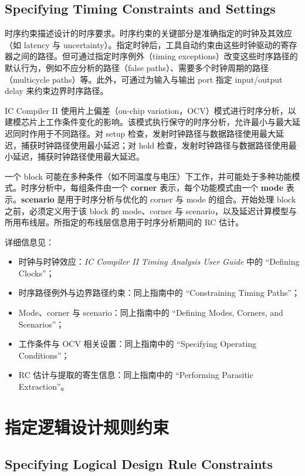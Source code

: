 \subsection*{Specifying Timing Constraints and Settings}

时序约束描述设计的时序要求。时序约束的关键部分是准确指定的时钟及其效应（如 latency 与 uncertainty）。指定时钟后，工具自动约束由这些时钟驱动的寄存器之间的路径。但可通过指定时序例外（timing exceptions）改变这些时序路径的默认行为，例如不应分析的路径（false paths）、需要多个时钟周期的路径（multicycle paths）等。此外，可通过为输入与输出 port 指定 input/output delay 来约束边界时序路径。

IC Compiler II 使用片上偏差（on-chip variation，OCV）模式进行时序分析，以建模芯片上工作条件变化的影响。该模式执行保守的时序分析，允许最小与最大延迟同时作用于不同路径。对 setup 检查，发射时钟路径与数据路径使用最大延迟，捕获时钟路径使用最小延迟；对 hold 检查，发射时钟路径与数据路径使用最小延迟，捕获时钟路径使用最大延迟。

一个 block 可能在多种条件（如不同温度与电压）下工作，并可能处于多种功能模式。时序分析中，每组条件由一个 \textbf{corner} 表示，每个功能模式由一个 \textbf{mode} 表示。\textbf{scenario} 是用于时序分析与优化的 corner 与 mode 的组合。开始处理 block 之前，必须定义用于该 block 的 mode、corner 与 scenario，以及延迟计算模型与所用布线层。所指定的布线层信息用于时序分析期间的 RC 估计。

详细信息见：
\begin{itemize}
  \item 时钟与时钟效应：\textit{IC Compiler II Timing Analysis User Guide} 中的 ``Defining Clocks''；
  \item 时序路径例外与边界路径约束：同上指南中的 ``Constraining Timing Paths''；
  \item Mode、corner 与 scenario：同上指南中的 ``Defining Modes, Corners, and Scenarios''；
  \item 工作条件与 OCV 相关设置：同上指南中的 ``Specifying Operating Conditions''；
  \item RC 估计与提取的寄生信息：同上指南中的 ``Performing Parasitic Extraction''。
\end{itemize}

\section{指定逻辑设计规则约束}
\subsection*{Specifying Logical Design Rule Constraints}

